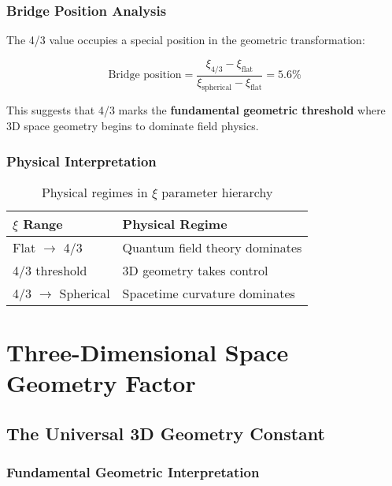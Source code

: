 \documentclass[12pt,a4paper]{article}
\newcommand{\xipar}{\ensuremath{\xi}}
\newcommand{\myrightarrow}{\ensuremath{\rightarrow}}
\begin{document}
	\subsubsection{Bridge Position Analysis}
	\label{subsubsec:bridge_position}
	
	The 4/3 value occupies a special position in the geometric transformation:
	
	\begin{equation}
		\text{Bridge position} = \frac{\xipar_{4/3} - \xipar_{\text{flat}}}{\xipar_{\text{spherical}} - \xipar_{\text{flat}}} = 5.6\%
		\label{eq:bridge_position}
	\end{equation}
	
	This suggests that 4/3 marks the \textbf{fundamental geometric threshold} where 3D space geometry begins to dominate field physics.
	
	\subsubsection{Physical Interpretation}
	\label{subsubsec:physical_interpretation}
	
	\begin{table}[htbp]
		\centering
		\begin{tabular}{ll}
			\toprule
			\textbf{$\xi$ Range} & \textbf{Physical Regime} \\
			\midrule
			Flat $\myrightarrow$ 4/3 & Quantum field theory dominates \\
			4/3 threshold & 3D geometry takes control \\
			4/3 $\myrightarrow$ Spherical & Spacetime curvature dominates \\
			\bottomrule
		\end{tabular}
		\caption{Physical regimes in $\xi$ parameter hierarchy}
		\label{tab:physical_regimes}
	\end{table}
	
	\section{Three-Dimensional Space Geometry Factor}
	\label{sec:3d_geometry_factor}
	
	\subsection{The Universal 3D Geometry Constant}
	\label{subsec:universal_3d_constant}
	
	\subsubsection{Fundamental Geometric Interpretation}
	\label{subsubsec:fundamental_interpretation}
	
\end{document}
